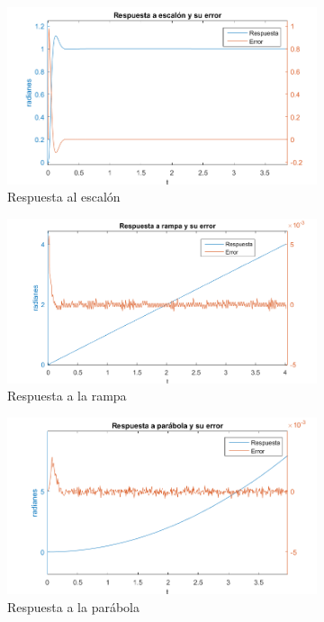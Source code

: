 \documentclass[a4paper]{article}
\begin{document}
\begin{figure}[htp]
	\begin{subfigure}{1\textwidth}
		\centering
		\includegraphics[width=10cm]{step2}
		\caption{Respuesta al escalón}
		\label{fig:step}
	\end{subfigure}

	\begin{subfigure}{1\textwidth}
		\centering
		\includegraphics[width=10cm]{ramp2}
		\caption{Respuesta a la rampa}
		\label{fig:ramp}
	\end{subfigure}

	\begin{subfigure}{1\textwidth}
		\centering
		\includegraphics[width=10cm]{parab2}
		\caption{Respuesta a la parábola}
		\label{fig:parab}
	\end{subfigure}
	\caption{}
	\label{respuestas}
\end{figure}
\end{document}
